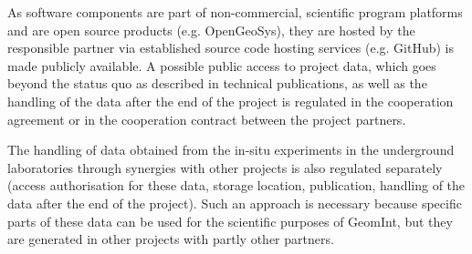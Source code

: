 As software components are part of non-commercial, scientific program platforms and are open source products (e.g. OpenGeoSys), they are hosted by the responsible partner via established source code hosting services (e.g. GitHub) is made publicly available. A possible public access to project data, which goes beyond the status quo as described in technical publications, as well as the handling of the data after the end of the project is regulated in the cooperation agreement or in the cooperation contract between the project partners. 

The handling of data obtained from the in-situ experiments in the underground laboratories through synergies with other projects is also regulated separately (access authorisation for these data, storage location, publication, handling of the data after the end of the project). Such an approach is necessary because specific parts of these data can be used for the scientific purposes of GeomInt, but they are generated in other projects with partly other partners.

